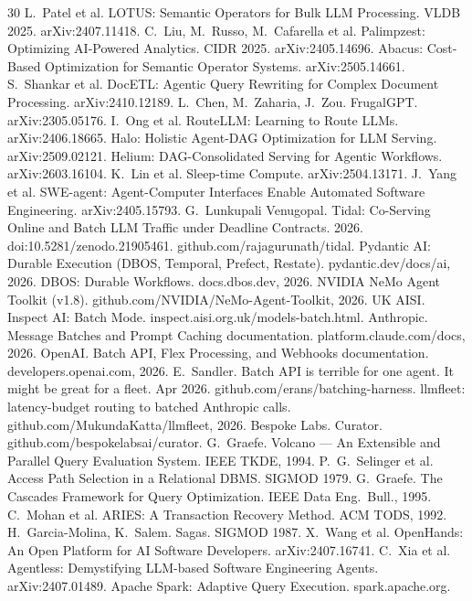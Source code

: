 \documentclass[11pt]{article}
\begin{document}
\begin{thebibliography}{30}\small
{} L.~Patel et al. LOTUS: Semantic Operators for Bulk LLM Processing. VLDB 2025. arXiv:2407.11418.
 C.~Liu, M.~Russo, M.~Cafarella et al. Palimpzest: Optimizing AI-Powered Analytics. CIDR 2025. arXiv:2405.14696.
 Abacus: Cost-Based Optimization for Semantic Operator Systems. arXiv:2505.14661.
 S.~Shankar et al. DocETL: Agentic Query Rewriting for Complex Document Processing. arXiv:2410.12189.
 L.~Chen, M.~Zaharia, J.~Zou. FrugalGPT. arXiv:2305.05176.
 I.~Ong et al. RouteLLM: Learning to Route LLMs. arXiv:2406.18665.
 Halo: Holistic Agent-DAG Optimization for LLM Serving. arXiv:2509.02121.
 Helium: DAG-Consolidated Serving for Agentic Workflows. arXiv:2603.16104.
 K.~Lin et al. Sleep-time Compute. arXiv:2504.13171.
 J.~Yang et al. SWE-agent: Agent-Computer Interfaces Enable Automated Software Engineering. arXiv:2405.15793.
 G.~Lunkupali Venugopal. Tidal: Co-Serving Online and Batch LLM Traffic under Deadline Contracts. 2026. doi:10.5281/zenodo.21905461. github.com/rajagurunath/tidal.
 Pydantic AI: Durable Execution (DBOS, Temporal, Prefect, Restate). pydantic.dev/docs/ai, 2026.
 DBOS: Durable Workflows. docs.dbos.dev, 2026.
 NVIDIA NeMo Agent Toolkit (v1.8). github.com/NVIDIA/NeMo-Agent-Toolkit, 2026.
 UK AISI. Inspect AI: Batch Mode. inspect.aisi.org.uk/models-batch.html.
 Anthropic. Message Batches and Prompt Caching documentation. platform.claude.com/docs, 2026.
 OpenAI. Batch API, Flex Processing, and Webhooks documentation. developers.openai.com, 2026.
 E.~Sandler. Batch API is terrible for one agent. It might be great for a fleet. Apr 2026. github.com/erans/batching-harness.
 llmfleet: latency-budget routing to batched Anthropic calls. github.com/MukundaKatta/llmfleet, 2026.
 Bespoke Labs. Curator. github.com/bespokelabsai/curator.
 G.~Graefe. Volcano --- An Extensible and Parallel Query Evaluation System. IEEE TKDE, 1994.
 P.~G.~Selinger et al. Access Path Selection in a Relational DBMS. SIGMOD 1979.
 G.~Graefe. The Cascades Framework for Query Optimization. IEEE Data Eng.\ Bull., 1995.
 C.~Mohan et al. ARIES: A Transaction Recovery Method. ACM TODS, 1992.
 H.~Garcia-Molina, K.~Salem. Sagas. SIGMOD 1987.
 X.~Wang et al. OpenHands: An Open Platform for AI Software Developers. arXiv:2407.16741.
 C.~Xia et al. Agentless: Demystifying LLM-based Software Engineering Agents. arXiv:2407.01489.
 Apache Spark: Adaptive Query Execution. spark.apache.org.
\end{thebibliography}
\end{document}

